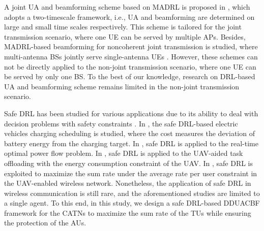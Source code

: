 A joint UA and beamforming scheme based on MADRL is proposed in \cite{yu2023distributed}, which adopts a two-timescale framework, i.e., UA and beamforming are determined on large and small time scales respectively.
This scheme is tailored for the joint transmission scenario, where one UE can be served by multiple APs.
Besides, MADRL-based beamforming for noncoherent joint transmission is studied, where multi-antenna BSs jointly serve single-antenna UEs \cite{bai2024distributed}.
However, these schemes can not be directly applied to the non-joint transmission scenario, where one UE can be served by only one BS.
To the best of our knowledge, research on DRL-based UA and beamforming scheme remains limited in the non-joint transmission scenario.


Safe DRL has been studied for various applications due to its ability to deal with decision problems with safety constraints \cite{li2019constrained, wu2024real, zhao2024safe, yu2024causal}.
In \cite{li2019constrained}, the safe DRL-based electric vehicles charging scheduling is studied, where the cost measures the deviation of battery energy from the charging target.
In \cite{wu2024real}, safe DRL is applied to the real-time optimal power flow problem.
In \cite{zhao2024safe}, safe DRL is applied to the UAV-aided task offloading with the energy consumption constraint of the UAV.
In \cite{yu2024causal}, safe DRL is exploited to maximize the sum rate under the average rate per user constraint in the UAV-enabled wireless network.
Nonetheless, the application of safe DRL in wireless communication is still rare, and the aforementioned studies are limited to a single agent.
To this end, in this study, we design a safe DRL-based DDUACBF framework for the CATNs to maximize the sum rate of the TUs while ensuring the protection of the AUs.